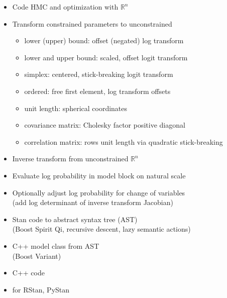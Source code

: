\documentclass[10pt]{report}
\newcommand{\sld}[1]{\newpage{\noindent\LARGE \ \ \
    \textcolor{MidnightBlue}{\bfseries #1}}\vspace*{4pt}}
\newcommand{\myemph}[1]{{\color{MidnightBlue}{\bfseries #1}}}
\begin{document}
\sld{Variable Transforms}
\begin{itemize}
\item Code HMC and optimization with $\mathbb{R}^n$ \myemph{support}
\item Transform constrained parameters to unconstrained
  \vspace*{-2pt}
  {\small
    \begin{itemize}
    \item lower (upper) bound: offset (negated) log transform
    \item lower and upper bound: scaled, offset logit transform
    \item simplex: centered, stick-breaking logit transform
    \item ordered: free first element, log transform offsets
    \item unit length: spherical coordinates
    \item covariance matrix: Cholesky factor positive diagonal 
    \item correlation matrix: rows unit length via quadratic stick-breaking
    \end{itemize}
  }
\end{itemize}


\sld{Variable Transforms (cont.)}
\begin{itemize}
\item Inverse transform from unconstrained $\mathbb{R}^n$
\item Evaluate log probability in model block on natural scale
\item Optionally adjust log probability for change of variables
  \\ {\footnotesize (add log determinant of inverse transform Jacobian)}
\end{itemize}

\sld{Parsing and Compilation}
\begin{itemize}
\item Stan code \myemph{parsed} to abstract syntax tree (AST)
  \\ {\footnotesize (Boost Spirit Qi, recursive descent, lazy semantic
    actions)}
\item C++ model class \myemph{code generation} from AST
  \\ {\footnotesize (Boost Variant)}
\item C++ code \myemph{compilation}
\item \myemph{Dynamic linking} for RStan, PyStan
\end{itemize}
\end{document}
